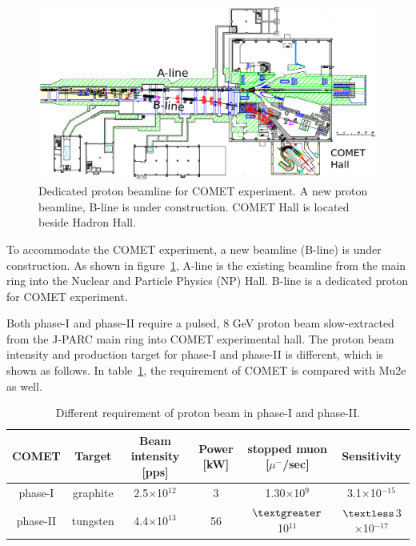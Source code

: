 \begin{figure}[H]
 \centering
 \includegraphics[scale=0.5]{chapter2/fig/beamline.pdf}
 \caption{Dedicated proton beamline for COMET experiment. A new proton beamline, B-line is under construction. COMET Hall is located beside Hadron Hall.}
 \label{bline}
\end{figure}
To accommodate the COMET experiment, a new beamline (B-line) is under construction.
As shown in figure~\ref{bline}, A-line is the existing beamline from the main ring into the Nuclear and Particle Physics (NP) Hall.
B-line is a dedicated proton for COMET experiment.

Both phase-I and phase-II require a pulsed, 8 GeV proton beam slow-extracted from the J-PARC main ring into COMET experimental hall.
The proton beam intensity and production target for phase-I and phase-II is different, which is shown as follows.
In table~\ref{intens}, the requirement of COMET is compared with Mu2e as well.
\begin{table}[H]
 \centering
 \begin{tabular}{cccccc} \hline \hline
  COMET & Target &  Beam intensity [pps] & Power [kW] & stopped muon [$\mu^-$/sec] & Sensitivity \\ \hline
  phase-I & graphite & 2.5$\times$10$^{12}$ & 3 & 1.30$\times$10$^9$ & 3.1$\times$10$^{-15}$ \\
  phase-II & tungsten & 4.4$\times$10$^{13}$ & 56 & $\textgreater$ 10$^{11}$ & $\textless$3$\times$10$^{-17}$ \\ \hline \hline
 \end{tabular}
 \caption{Different requirement of proton beam in phase-I and phase-II.}
 \label{intens}
\end{table}


